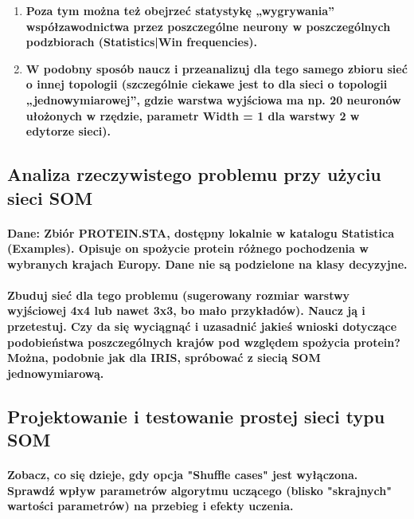 \begin{enumerate}
\item \textbf{
Poza tym można też obejrzeć statystykę „wygrywania” współzawodnictwa przez poszczególne neurony w poszczególnych podzbiorach (Statistics|Win frequencies).}

\item \textbf{
W podobny sposób naucz i przeanalizuj dla tego samego zbioru sieć o innej topologii (szczególnie ciekawe jest to dla sieci o topologii „jednowymiarowej”, gdzie warstwa wyjściowa ma np. 20 neuronów ułożonych w rzędzie, parametr Width = 1 dla warstwy 2 w edytorze sieci).}
	
\end{enumerate}

\subsection{ Analiza rzeczywistego problemu przy użyciu sieci SOM}

 \paragraph{\textbf{Dane: Zbiór PROTEIN.STA, dostępny lokalnie w katalogu Statistica (Examples). Opisuje on spożycie protein różnego pochodzenia w wybranych krajach Europy. Dane nie są podzielone na klasy decyzyjne.}}
 \paragraph{\textbf{Zbuduj sieć dla tego problemu (sugerowany rozmiar warstwy wyjściowej 4x4 lub nawet 3x3, bo mało przykładów). Naucz ją i przetestuj. Czy da się wyciągnąć i uzasadnić jakieś wnioski dotyczące podobieństwa poszczególnych krajów pod względem spożycia protein? Można, podobnie jak dla IRIS, spróbować z siecią SOM jednowymiarową.}}


\subsection{Projektowanie i testowanie prostej sieci typu SOM}
 \paragraph{\textbf{Zobacz, co się dzieje, gdy opcja "Shuffle cases" jest wyłączona. Sprawdź wpływ parametrów algorytmu uczącego (blisko "skrajnych" wartości parametrów) na przebieg i efekty uczenia.}}